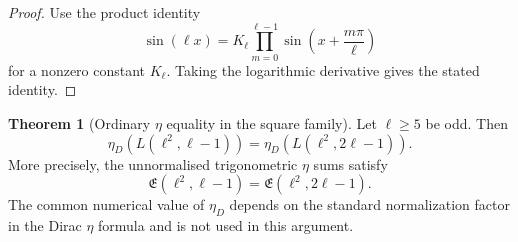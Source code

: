 \documentclass{article}
\theoremstyle{definition}
\newtheorem{theorem}{Theorem}[section]
\numberwithin{equation}{section}
\begin{document}
\begin{proof}
Use the product identity
\begin{equation}
\sin(\ell x)=K_\ell\prod_{m=0}^{\ell-1}\sin\left(x+\frac{m\pi}{\ell}\right)
\end{equation}
for a nonzero constant $K_\ell$.  Taking the logarithmic derivative gives the stated identity.
\end{proof}

\begin{theorem}[Ordinary $\eta$ equality in the square family]
Let $\ell\geq 5$ be odd.  Then
\begin{equation}
\eta_D(L(\ell^2,\ell-1))=\eta_D(L(\ell^2,2\ell-1)).
\end{equation}
More precisely, the unnormalised trigonometric $\eta$ sums satisfy
\begin{equation}
\mathfrak E(\ell^2,\ell-1)=\mathfrak E(\ell^2,2\ell-1).
\end{equation}
The common numerical value of $\eta_D$ depends on the standard normalization factor in the Dirac $\eta$ formula and is not used in this argument.
\end{theorem}
\end{document}
